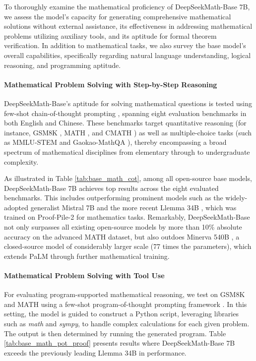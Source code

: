 To thoroughly examine the mathematical proficiency of DeepSeekMath-Base 7B, we assess the model's capacity for generating comprehensive mathematical solutions without external assistance, its effectiveness in addressing mathematical problems utilizing auxiliary tools, and its aptitude for formal theorem verification. In addition to mathematical tasks, we also survey the base model's overall capabilities, specifically regarding natural language understanding, logical reasoning, and programming aptitude.

\paragraph{Mathematical Problem Solving with Step-by-Step Reasoning}

DeepSeekMath-Base's aptitude for solving mathematical questions is tested using few-shot chain-of-thought prompting \citep{cot}, spanning eight evaluation benchmarks in both English and Chinese. These benchmarks target quantitative reasoning (for instance, GSM8K \citep{gsm8k}, MATH \citep{MATH}, and CMATH \citep{wei2023cmath}) as well as multiple-choice tasks (such as MMLU-STEM \citep{mmlu} and Gaokao-MathQA \citep{agieval}), thereby encompassing a broad spectrum of mathematical disciplines from elementary through to undergraduate complexity.

As illustrated in Table \ref{tab:base_math_cot}, among all open-source base models, DeepSeekMath-Base 7B achieves top results across the eight evaluated benchmarks. This includes outperforming prominent models such as the widely-adopted generalist Mistral 7B \citep{mistral} and the more recent Llemma 34B \citep{llemma}, which was trained on Proof-Pile-2 \citep{llemma} for mathematics tasks. Remarkably, DeepSeekMath-Base not only surpasses all existing open-source models by more than 10\% absolute accuracy on the advanced MATH dataset, but also outdoes Minerva 540B \citep{minerva}, a closed-source model of considerably larger scale (77 times the parameters), which extends PaLM \citep{palm} through further mathematical training.

\paragraph{Mathematical Problem Solving with Tool Use} For evaluating program-supported mathematical reasoning, we test on GSM8K and MATH using a few-shot program-of-thought prompting framework \citep{pot,pal}. In this setting, the model is guided to construct a Python script, leveraging libraries such as \textit{math} and \textit{sympy}, to handle complex calculations for each given problem. The output is then determined by running the generated program. Table \ref{tab:base_math_pot_proof} presents results where DeepSeekMath-Base 7B exceeds the previously leading Llemma 34B in performance.

